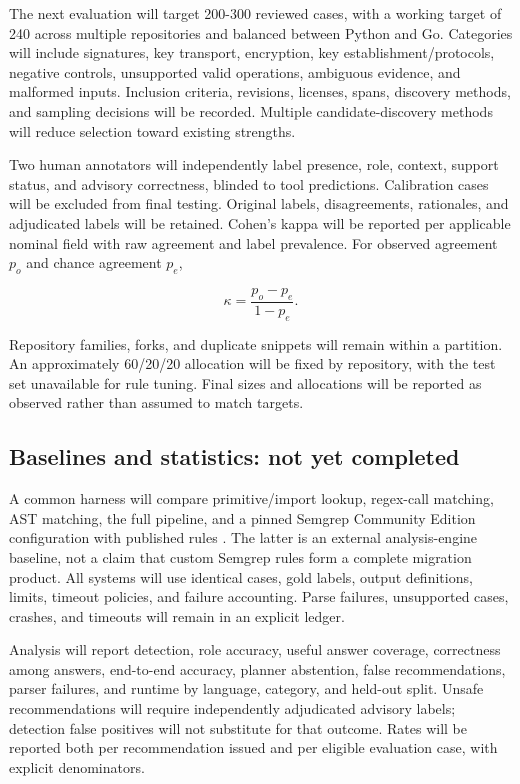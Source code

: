 \documentclass[conference,a4paper]{IEEEtran}
\begin{document}
The next evaluation will target 200-300 reviewed cases, with a working target of 240 across multiple repositories and balanced between Python and Go. Categories will include signatures, key transport, encryption, key establishment/protocols, negative controls, unsupported valid operations, ambiguous evidence, and malformed inputs. Inclusion criteria, revisions, licenses, spans, discovery methods, and sampling decisions will be recorded. Multiple candidate-discovery methods will reduce selection toward existing strengths.

Two human annotators will independently label presence, role, context, support status, and advisory correctness, blinded to tool predictions. Calibration cases will be excluded from final testing. Original labels, disagreements, rationales, and adjudicated labels will be retained. Cohen's kappa \cite{ref11} will be reported per applicable nominal field with raw agreement and label prevalence. For observed agreement \(p_o\) and chance agreement \(p_e\),

\begin{equation}
\kappa=\frac{p_o-p_e}{1-p_e}.
\end{equation}

Repository families, forks, and duplicate snippets will remain within a partition. An approximately 60/20/20 allocation will be fixed by repository, with the test set unavailable for rule tuning. Final sizes and allocations will be reported as observed rather than assumed to match targets.

\subsection{Baselines and statistics: not yet completed}

A common harness will compare primitive/import lookup, regex-call matching, AST matching, the full pipeline, and a pinned Semgrep Community Edition configuration with published rules \cite{ref12}. The latter is an external analysis-engine baseline, not a claim that custom Semgrep rules form a complete migration product. All systems will use identical cases, gold labels, output definitions, limits, timeout policies, and failure accounting. Parse failures, unsupported cases, crashes, and timeouts will remain in an explicit ledger.

Analysis will report detection, role accuracy, useful answer coverage, correctness among answers, end-to-end accuracy, planner abstention, false recommendations, parser failures, and runtime by language, category, and held-out split. Unsafe recommendations will require independently adjudicated advisory labels; detection false positives will not substitute for that outcome. Rates will be reported both per recommendation issued and per eligible evaluation case, with explicit denominators.
\end{document}
